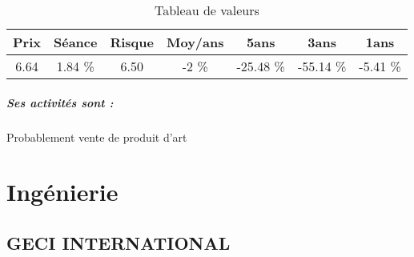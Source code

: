 \documentclass[11pt,a4paper]{report}%
\begin{document}
\begin{table}[H]
  \centering
    \begin{tabular}{|c|c|c|c|c|c|c|}
    \hline
    Prix & Séance & Risque  & Moy/ans & 5ans & 3ans & 1ans \\
    \hline
    6.64 &    1.84 \%    & 6.50 & -2 \% & -25.48 \% & -55.14 \% & -5.41 \% \\
    \hline
    \end{tabular}%
        \label{tab:table_ARTMARKET-COM-SA}%
      \caption{Tableau de valeurs}
\end{table}%

\paragraph{Ses activités sont : } Probablement vente de produit d’art 
    
    \newpage\chapter{Ingénierie}


\section{GECI INTERNATIONAL}
\end{document}
